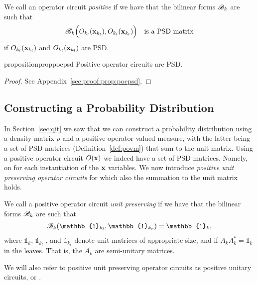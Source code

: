 \begin{definition}
	We call an operator circuit \textit{positive} if we have that the bilinear forms $\mathscr{B}_k$ are such that
	\begin{align}
		\mathscr{B}_k \Bigl(O_{k_l}(\mathbf{x}_{k_l}), O_{k_l}(\mathbf{x}_{k_l}) \Bigr) \quad \text{is a PSD matrix}
		\label{def:eq:bilinear_psd}
	\end{align}
	if $O_{k_l}(\mathbf{x}_{k_l})$ and $O_{k_l}(\mathbf{x}_{k_l})$ are PSD.
\end{definition}



\begin{restatable}{proposition}{proppocpsd}
	\label{prop:pocpsd}
	Positive operator circuits are PSD.
\end{restatable}

\begin{proof}
	See Appendix~\ref{sec:proof:prop:pocpsd}.
\end{proof}






\subsection{Constructing a Probability Distribution}


In Section~\ref{sec:qit} we saw that we can construct a probability distribution using a density matrix $\rho$ and a positive operator-valued measure, with the latter being a set of PSD matrices (\cf Definition~\ref{def:povm}) that sum to the unit matrix. Using a positive operator circuit $O(\mathbf{x})$ we indeed have a set of PSD matrices. Namely, on for each instantiation of the $\mathbf{x}$ variables. We now introduce \textit{positive unit preserving operator circuits} for which also the summation to the unit matrix holds.

\begin{definition}
	\label{def:bilinear_unitpreserving}
	We call a positive operator circuit \textit{unit preserving} if we have that the bilinear forms $\mathscr{B}_k$ are such that
	\begin{align}
		\bilinear_k(\mathbb{1}_{k_l}, \mathbb{1}_{k_r})= \mathbb{1}_k,
		\label{def:eq:bilinear_unitpreserving}
	\end{align}
	where $\mathbb{1}_{k}$, $\mathbb{1}_{k_l}$ , and $\mathbb{1}_{k_r}$  denote unit matrices of appropriate size, and if $A_{k}A_{k}^{*}= \mathbb{1}_{k}$ in the leaves. That is, the $A_{k}$ are semi-unitary matrices.
\end{definition}
We will also refer to positive unit preserving operator circuits as positive unitary circuits, or \puncs.


